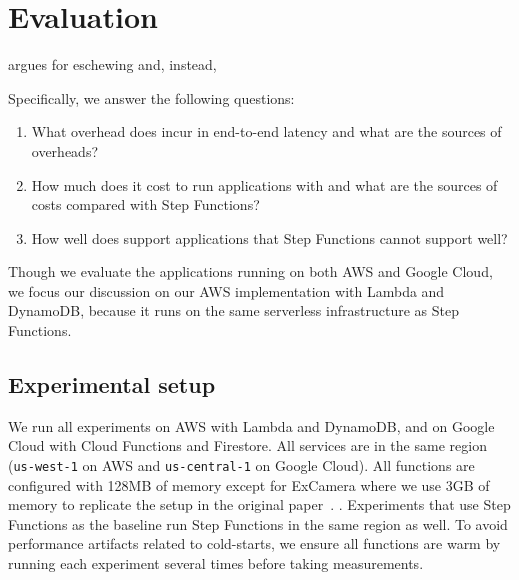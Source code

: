 \section{Evaluation}\label{sec:eval}

\name{} argues for eschewing  and,
 instead, 


Specifically, we answer the following questions:

\begin{enumerate}

  \item What overhead does \name{} incur in end-to-end latency and what are
   the sources of  overheads?

  \item How much does it cost to run applications with \name{} and what are
   the sources of costs compared with Step Functions?

  \item How well does \name{} support applications that Step Functions
   cannot support well?

\end{enumerate}

Though we evaluate the applications running on both AWS and Google Cloud, we
focus our discussion on our AWS implementation with Lambda and DynamoDB,
because it runs on the same serverless infrastructure as Step Functions.

\subsection{Experimental setup}

We run all experiments on AWS with Lambda and DynamoDB, and on Google Cloud
with Cloud Functions and Firestore. All services are in the same region
(\texttt{us-west-1} on AWS and \texttt{us-central-1} on Google Cloud). All
functions are configured with 128MB of memory except for ExCamera where we
use 3GB of memory to replicate the setup in the original paper~\cite
{excamera, gg-atc}. . Experiments that use Step Functions as the baseline run
Step Functions in the same region as well. To avoid performance artifacts
related to cold-starts, we ensure all functions are warm by running each
experiment several times before taking measurements.


